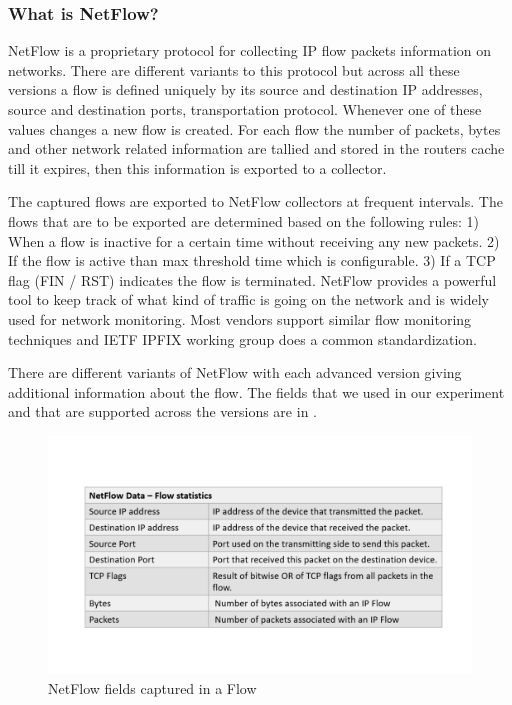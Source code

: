 \subsubsection{What is NetFlow?}
NetFlow is a proprietary protocol for collecting IP flow packets information on networks. There are different variants to this protocol but across all these versions a flow is defined uniquely by its source and destination IP addresses, source and destination ports, transportation protocol. Whenever one of these values changes a new flow is created. For each flow the number of packets, bytes and other network related information are tallied and stored in the routers cache till it expires, then this information is exported to a collector. 

The captured flows are exported to NetFlow collectors at frequent intervals. The flows that are to be exported are determined based on the following rules: 1) When a flow is inactive for a certain time without receiving any new packets. 2) If the flow is active than max threshold time which is configurable. 3) If a TCP flag (FIN / RST) indicates the flow is terminated. NetFlow provides a powerful tool to keep track of what kind of traffic is going on the network and is widely used for network monitoring. Most vendors support similar flow monitoring techniques and IETF IPFIX working group does a common standardization.

There are different variants of NetFlow with each advanced version giving additional information about the flow. The fields that we used in our experiment and that are supported across the versions are in .

\begin{figure}[t]
	\centerline{
	\includegraphics[trim=2cm 2cm 2cm 2cm, scale = 0.55]{netflow.pdf}}
	\caption{NetFlow fields captured in a Flow }
\end{figure}

